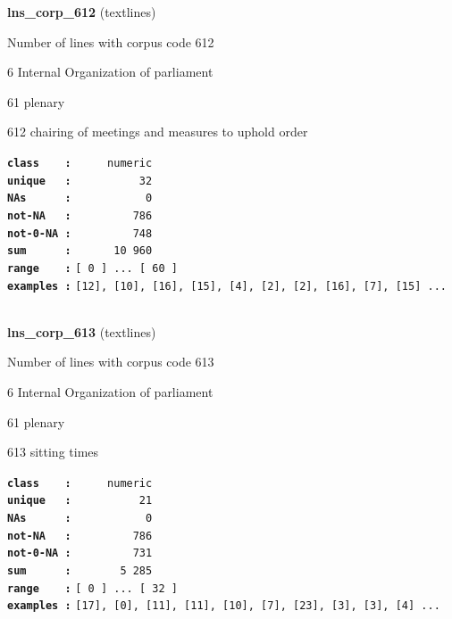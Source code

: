 \documentclass[]{article}
\begin{document}
\textbf{lns\_corp\_612} (textlines)

Number of lines with corpus code 612

6 Internal Organization of parliament

61 plenary

612 chairing of meetings and measures to uphold order

\textbf{\texttt{class\ \ \ \ :}} \texttt{~~~~~numeric}\\
\textbf{\texttt{unique\ \ \ :}} \texttt{~~~~~~~~~~32}\\
\textbf{\texttt{NAs\ \ \ \ \ \ :}} \texttt{~~~~~~~~~~~0}\\
\textbf{\texttt{not-NA\ \ \ :}} \texttt{~~~~~~~~~786}\\
\textbf{\texttt{not-0-NA\ :}} \texttt{~~~~~~~~~748}\\
\textbf{\texttt{sum\ \ \ \ \ \ :}} \texttt{~~~~~~10~960}\\
\textbf{\texttt{range\ \ \ \ :}}
\texttt{{[}\ 0\ {]}\ ...\ {[}\ 60\ {]}}\\
\textbf{\texttt{examples\ :}}
\texttt{{[}12{]},\ {[}10{]},\ {[}16{]},\ {[}15{]},\ {[}4{]},\ {[}2{]},\ {[}2{]},\ {[}16{]},\ {[}7{]},\ {[}15{]}\ ...}\\

~

\textbf{lns\_corp\_613} (textlines)

Number of lines with corpus code 613

6 Internal Organization of parliament

61 plenary

613 sitting times

\textbf{\texttt{class\ \ \ \ :}} \texttt{~~~~~numeric}\\
\textbf{\texttt{unique\ \ \ :}} \texttt{~~~~~~~~~~21}\\
\textbf{\texttt{NAs\ \ \ \ \ \ :}} \texttt{~~~~~~~~~~~0}\\
\textbf{\texttt{not-NA\ \ \ :}} \texttt{~~~~~~~~~786}\\
\textbf{\texttt{not-0-NA\ :}} \texttt{~~~~~~~~~731}\\
\textbf{\texttt{sum\ \ \ \ \ \ :}} \texttt{~~~~~~~5~285}\\
\textbf{\texttt{range\ \ \ \ :}}
\texttt{{[}\ 0\ {]}\ ...\ {[}\ 32\ {]}}\\
\textbf{\texttt{examples\ :}}
\texttt{{[}17{]},\ {[}0{]},\ {[}11{]},\ {[}11{]},\ {[}10{]},\ {[}7{]},\ {[}23{]},\ {[}3{]},\ {[}3{]},\ {[}4{]}\ ...}\\
\end{document}
